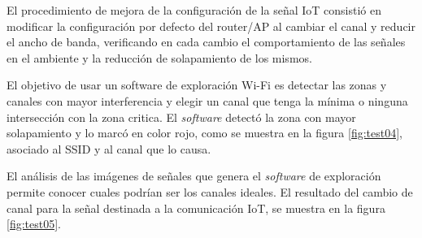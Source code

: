 El procedimiento de mejora de la configuración de la señal IoT consistió en modificar la configuración por defecto del router/AP al cambiar el canal y reducir el ancho de banda, verificando en cada cambio el comportamiento de las señales en el ambiente y la reducción de solapamiento de los mismos.



El objetivo de usar un software de exploración Wi-Fi es detectar las zonas y canales con mayor interferencia y elegir un canal que tenga la mínima o ninguna intersección con la zona critica. El \emph{software} detectó la zona con mayor solapamiento y lo marcó en color rojo, como se muestra en la figura \ref{fig:test04}, asociado al SSID y al canal que lo causa.

El análisis de las imágenes de señales que genera el \emph{software} de exploración permite conocer cuales podrían ser los canales ideales. El resultado del cambio de canal para la señal destinada a la comunicación IoT, se muestra en la figura \ref{fig:test05}. 





